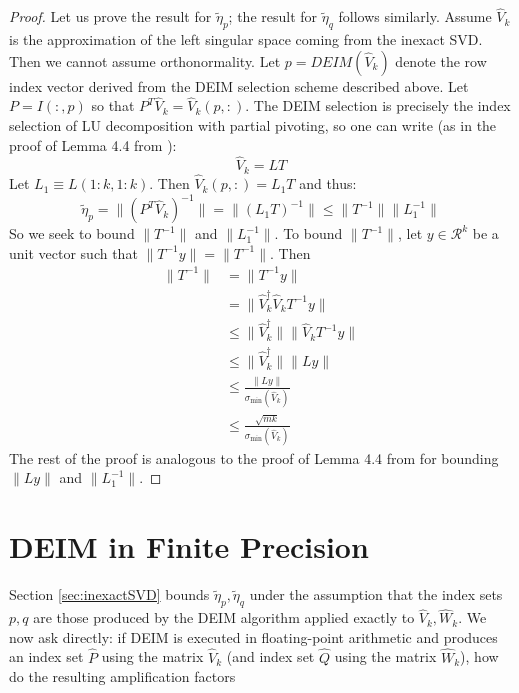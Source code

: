 \documentclass[12pt, a4paper]{article}
\newcommand{\What}{\widehat{W}}
\newcommand{\Vhat}{\widehat{V}}
\newcommand{\Phat}{\widehat{P}}
\newcommand{\Qhat}{\widehat{Q}}
\def\norm#1{\|#1\|}
\theoremstyle{remark}
\begin{document}
\begin{proof}
    Let us prove the result for $\tilde{\eta}_p$; the result for $\tilde{\eta}_q$ follows similarly. Assume $\Vhat_k$ is the approximation of the left singular space coming from the inexact SVD. Then we cannot assume orthonormality. Let $p = DEIM(\Vhat_k)$ denote the row index vector derived from the DEIM selection scheme described above. Let $P = I(:,p)$ so that $P^T\Vhat_k = \Vhat_k(p,:)$. The DEIM selection is precisely the index selection of LU decomposition with partial pivoting, so one can write (as in the proof of Lemma 4.4 from \cite{sorensen2016deim}): 
    \begin{equation*}
        \Vhat_k = LT
    \end{equation*}
    Let $L_1 \equiv L(1:k,1:k)$. Then $\Vhat_k(p,:) = L_1T$ and thus:
    \begin{equation*}
        \tilde{\eta}_p = \norm{(P^T\Vhat_k)^{-1}} = \norm{(L_1T)^{-1}} \leq \norm{T^{-1}}\norm{L_1^{-1}}
    \end{equation*}
    So we seek to bound $\norm{T^{-1}}$ and $\norm{L_1^{-1}}$. To bound $\norm{T^{-1}}$, let $y \in \mathcal{R}^k$ be a unit vector such that $\norm{T^{-1}y} = \norm{T^{-1}}$. Then
    \begin{equation*}
    \begin{split}
        \norm{T^{-1}} &= \norm{T^{-1}y} \\
        &= \norm{\Vhat_k^\dagger \Vhat_k  T^{-1}y}\\
        &\leq \norm{\Vhat_k^\dagger} \norm{\Vhat_k  T^{-1}y}\\
        &\leq \norm{\hat{V}_k^\dagger} \norm{Ly}\\
        &\leq \frac{\norm{Ly}}{\sigma_{\min}(\Vhat_k)}\\
        &\leq \frac{\sqrt{m k}}{\sigma_{\min}(\Vhat_k)}
    \end{split}
    \end{equation*}
    The rest of the proof is analogous to the proof of Lemma 4.4 from \cite{sorensen2016deim} for bounding $\norm{Ly}$ and $\norm{L_1^{-1}}$. 
\end{proof}
\section{DEIM in Finite Precision}
\label{sec:fpDEIM}

Section \ref{sec:inexactSVD} bounds $\tilde\eta_p,\tilde\eta_q$ under the assumption that the
index sets $p,q$ are those produced by the DEIM algorithm applied
exactly to $\Vhat_k,\What_k$. We now ask directly: if DEIM is executed in
floating-point arithmetic and produces an index set $\Phat$ using the matrix
$\Vhat_k$ (and index set $\Qhat$ using the matrix $\What_k$), how do the resulting amplification factors
\end{document}
